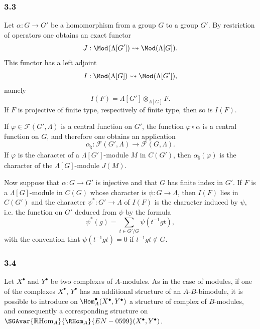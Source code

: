 \subsubsection*{3.3}

Let $\alpha:G\to G'$ be a homomorphism from a group $G$ to a group $G'$. By restriction of operators one obtains an exact functor
\[
J:\Mod(\Lambda[G'])\rightsquigarrow\Mod(\Lambda[G]).
\]
This functor has a left adjoint
\[
I:\Mod(\Lambda[G])\rightsquigarrow\Mod(\Lambda[G']),
\]
namely
\[
I(F)=\Lambda[G']\otimes_{\Lambda[G]}F.
\]
If $F$ is projective of finite type, respectively of finite type, then so is $I(F)$.

If $\varphi\in\mathcal F(G',\Lambda)$ is a central function on $G'$, the function $\varphi\circ\alpha$ is a central function on $G$, and therefore one obtains an application
\[
\alpha_\natural: \mathcal F(G',\Lambda)\longrightarrow\mathcal F(G,\Lambda).
\]
If $\varphi$ is the character of a $\Lambda[G']$-module $M$ in $C(G')$, then $\alpha_\natural(\varphi)$ is the character of the $\Lambda[G]$-module $J(M)$.

Now suppose that $\alpha:G\to G'$ is injective and that $G$ has finite index in $G'$. If $F$ is a $\Lambda[G]$-module in $C(G)$ whose character is $\psi:G\to\Lambda$, then $I(F)$ lies in $C(G')$ and the character $\psi^*:G'\to\Lambda$ of $I(F)$ is the character induced by $\psi$, i.e. the function on $G'$ deduced from $\psi$ by the formula
\[
\psi^*(g)=\sum_{t\in G'/G}\psi(t^{-1}gt),
\tag{3.3.1}
\]
with the convention that $\psi(t^{-1}gt)=0$ if $t^{-1}gt\notin G$.

\subsubsection*{3.4}

Let $X^\bullet$ and $Y^\bullet$ be two complexes of $A$-modules. As in the case of modules, if one of the complexes $X^\bullet$, $Y^\bullet$ has an additional structure of an $A$-$B$-bimodule, it is possible to introduce on $\Hom_A^\bullet(X^\bullet,Y^\bullet)$ a structure of complex of $B$-modules, and consequently a corresponding structure on $\SGAvar{\mathbb{R}\mathrm{Hom}_A}{\RHom_A}{EN-0599}(X^\bullet,Y^\bullet)$.

